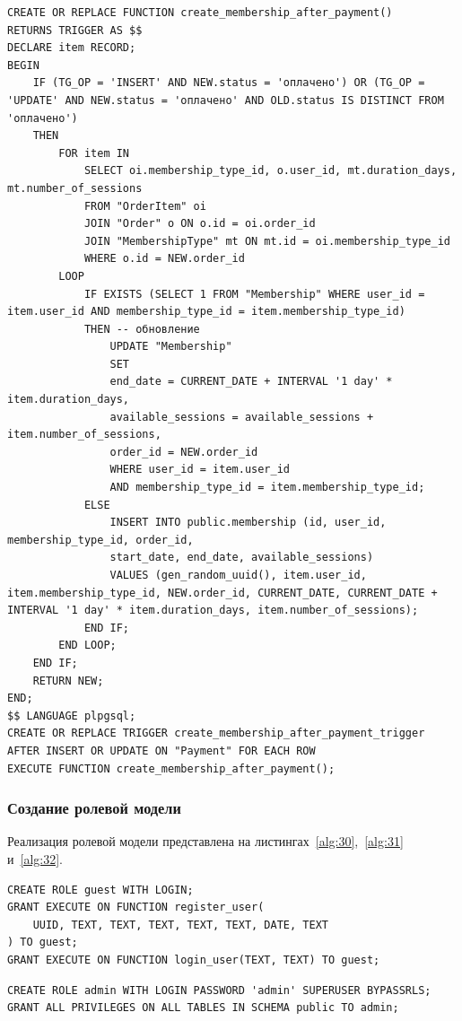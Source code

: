 \begin{lstlisting}[label=alg:29, caption=Реализация триггера для создания абонемента или продления его после успешного платежа , captionpos=t]
CREATE OR REPLACE FUNCTION create_membership_after_payment()
RETURNS TRIGGER AS $$
DECLARE item RECORD;
BEGIN
	IF (TG_OP = 'INSERT' AND NEW.status = 'оплачено') OR (TG_OP = 'UPDATE' AND NEW.status = 'оплачено' AND OLD.status IS DISTINCT FROM 'оплачено') 
	THEN
		FOR item IN
			SELECT oi.membership_type_id, o.user_id, mt.duration_days, mt.number_of_sessions
			FROM "OrderItem" oi
			JOIN "Order" o ON o.id = oi.order_id
			JOIN "MembershipType" mt ON mt.id = oi.membership_type_id
			WHERE o.id = NEW.order_id
		LOOP
			IF EXISTS (SELECT 1 FROM "Membership" WHERE user_id = item.user_id AND membership_type_id = item.membership_type_id) 
			THEN -- обновление
				UPDATE "Membership"
				SET 
				end_date = CURRENT_DATE + INTERVAL '1 day' * item.duration_days,
				available_sessions = available_sessions + item.number_of_sessions,
				order_id = NEW.order_id
				WHERE user_id = item.user_id
				AND membership_type_id = item.membership_type_id;
			ELSE
				INSERT INTO public.membership (id, user_id, membership_type_id, order_id,
				start_date, end_date, available_sessions)
				VALUES (gen_random_uuid(), item.user_id, item.membership_type_id, NEW.order_id, CURRENT_DATE, CURRENT_DATE + INTERVAL '1 day' * item.duration_days, item.number_of_sessions);
			END IF;
		END LOOP;
	END IF;
	RETURN NEW;
END;
$$ LANGUAGE plpgsql;
CREATE OR REPLACE TRIGGER create_membership_after_payment_trigger
AFTER INSERT OR UPDATE ON "Payment" FOR EACH ROW
EXECUTE FUNCTION create_membership_after_payment();
\end{lstlisting}

\subsubsection{Создание ролевой модели}

Реализация ролевой модели представлена на листингах~\ref{alg:30},~\ref{alg:31} и~\ref{alg:32}.

\begin{lstlisting}[label=alg:30, caption=Реализация роли Guest (гость), captionpos=t]
CREATE ROLE guest WITH LOGIN;
GRANT EXECUTE ON FUNCTION register_user(
	UUID, TEXT, TEXT, TEXT, TEXT, TEXT, DATE, TEXT
) TO guest;
GRANT EXECUTE ON FUNCTION login_user(TEXT, TEXT) TO guest;
\end{lstlisting}

\begin{lstlisting}[label=alg:31, caption=Реализация роли Admin (администратор), captionpos=t]
CREATE ROLE admin WITH LOGIN PASSWORD 'admin' SUPERUSER BYPASSRLS;
GRANT ALL PRIVILEGES ON ALL TABLES IN SCHEMA public TO admin;
\end{lstlisting}

